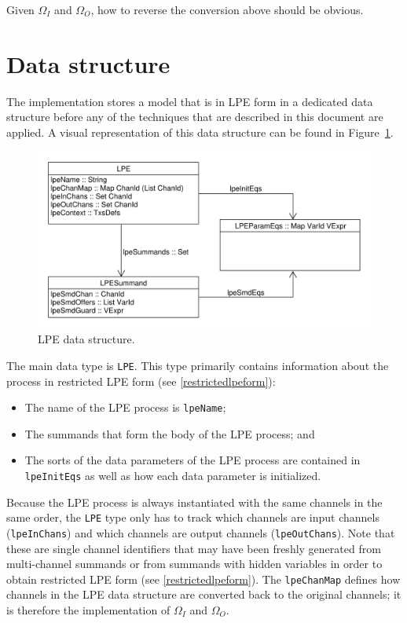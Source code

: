 Given $\Omega_I$ and $\Omega_O$, how to reverse the conversion above should be obvious.

\section{Data structure}

The implementation stores a \txs{} model that is in LPE form in a dedicated data structure before any of the techniques that are described in this document are applied.
A visual representation of this data structure can be found in Figure~\ref{lpedatastructure:fig}.

\begin{figure}[!ht]
\begin{center}
\includegraphics[width=0.7\linewidth]{images/lpe-types}
\caption{LPE data structure.}
\label{lpedatastructure:fig}
\end{center}
\end{figure}

The main data type is \texttt{LPE}.
This type primarily contains information about the \txs{} process in restricted LPE form (see \ref{restrictedlpeform}):
\begin{itemize}
\item The name of the LPE process is \texttt{lpeName};
\item The summands that form the body of the LPE process; and
\item The sorts of the data parameters of the LPE process are contained in \texttt{lpeInitEqs} as well as how each data parameter is initialized.
\end{itemize}

Because the LPE process is always instantiated with the same channels in the same order, the \texttt{LPE} type only has to track which channels are input channels (\texttt{lpeInChans}) and which channels are output channels (\texttt{lpeOutChans}).
Note that these are single channel identifiers that may have been freshly generated from multi-channel summands or from summands with hidden variables in order to obtain restricted LPE form (see \ref{restrictedlpeform}).
The \texttt{lpeChanMap} defines how channels in the LPE data structure are converted back to the original channels; it is therefore the implementation of $\Omega_I$ and $\Omega_O$.

